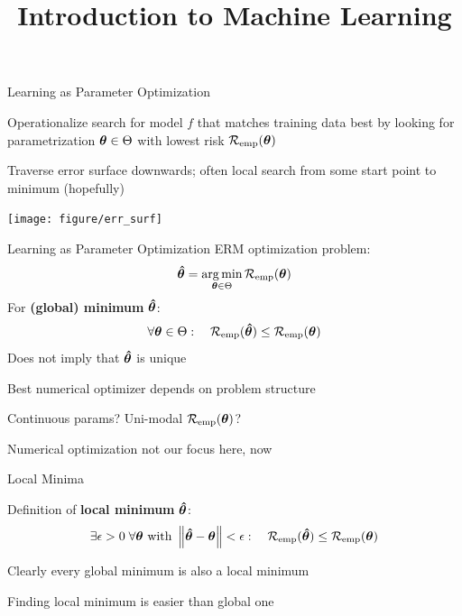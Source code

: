 \documentclass[11pt,compress,t,notes=noshow, xcolor=table]{beamer}
\title{Introduction to Machine Learning}
\begin{document}


\begin{framei}{Learning as Parameter Optimization}
\item Operationalize search for model $f$ that matches training data best by looking for parametrization $\bm{\theta} \in \Theta$ with lowest risk $\mathcal{R}_{\text{emp}}(\bm{\theta})$
\item Traverse error surface downwards; often local search from some start point to minimum (hopefully)
\vfill
\begin{center}
\texttt{[image: figure/err\_surf]}
\end{center}
\end{framei}


\begin{frame2}{Learning as Parameter Optimization}
ERM optimization problem:
$$
\bm{\hat\theta} = \mathop{\mathrm{arg\,min}}_{\bm{\theta} \in \Theta} \mathcal{R}_{\text{emp}}(\bm{\theta}) 
$$
For \textbf{(global) minimum} $\bm{\hat\theta}$:
$$
\forall \bm{\theta} \in \Theta :\quad \mathcal{R}_{\text{emp}}(\bm{\hat\theta}) \leq \mathcal{R}_{\text{emp}}(\bm{\theta}) 
$$
Does not imply that $\bm{\hat\theta}$ is unique \\
\vfill
\begin{itemizeM}
\item Best numerical optimizer depends on problem structure
\item Continuous params? Uni-modal $\mathcal{R}_{\text{emp}}(\bm{\theta})$? 
\item Numerical optimization not our focus here, now
\end{itemizeM}
\end{frame2}


\begin{framei}{Local Minima}
\item Definition of \textbf{local minimum} $\bm{\hat\theta}$:
$$
\exists \epsilon > 0\; \forall \bm{\theta} \text{ with } \left\Vert\bm{\hat\theta} - \bm{\theta}\right\Vert < \epsilon: \quad \mathcal{R}_{\text{emp}}(\bm{\hat\theta}) \leq \mathcal{R}_{\text{emp}}(\bm{\theta}) 
$$
\item Clearly every global minimum is also a local minimum
\item Finding local minimum is easier than global one
\vfill
{}
\end{framei}
\end{document}
